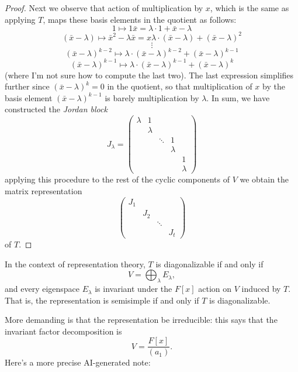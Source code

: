 \begin{proof}
Next we observe that action of multiplication
by $x$, which is the same as applying $T$,
maps these basis elements in the quotient as
follows:
$$
1\mapsto 1\bar{x}
=
\lambda\cdot 1+\bar{x}-\lambda
$$
$$
(\bar{x}-\lambda)
\mapsto
\bar{x}^2-\lambda\bar{x}
=
x\lambda\cdot(\bar{x}-\lambda)
+
(\bar{x}-\lambda)^2
$$
$$
\vdots
$$
$$
(\bar{x}-\lambda)^{k-2}
\mapsto
\lambda\cdot(\bar{x}-\lambda)^{k-2}
+
(\bar{x}-\lambda)^{k-1}
$$
$$
(\bar{x}-\lambda)^{k-1}
\mapsto
\lambda\cdot(\bar{x}-\lambda)^{k-1}
+
(\bar{x}-\lambda)^k
$$
(where I'm not sure how to compute the last
two). The last expression simplifies further
since $(\bar{x}-\lambda)^k=0$ in the
quotient, so that multiplication of $x$ by
the basis element $(\bar{x}-\lambda)^{k-1}$
is barely multiplication by $\lambda$. In sum,
we have constructed the {\it Jordan block}
$$
J_{\lambda}
=
\begin{pmatrix}
\lambda &1\\
&\lambda\\
&&\ddots&1\\
&&&\lambda\\
&&&&1\\
&&&&\lambda
\end{pmatrix}
$$
applying this procedure to the rest of the
cyclic components of $V$ we obtain the
matrix representation
$$
\begin{pmatrix}
J_1\\
&J_2\\
&&\ddots\\
&&&J_t
\end{pmatrix}
$$
of $T$.
\end{proof}

\noindent
In the context of representation theory,
$T$ is diagonalizable if and only if
$$
V=\bigoplus_\lambda E_\lambda,
$$
and every eigenspace $E_\lambda$
is invariant under the $F[x]$ action
on $V$ induced by $T$. That is,
the representation is semisimple
if and only if $T$ is diagonalizable.

More demanding is that the representation
be irreducible: this says that
the invariant factor decomposition is
$$
V=\frac{F[x]}{(a_1)}.
$$
Here's a more precise AI-generated note:

